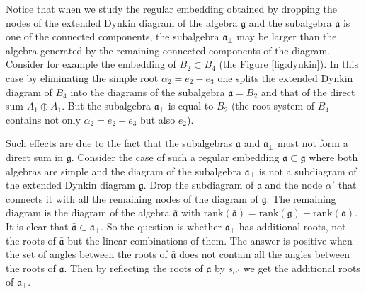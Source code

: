 \documentclass[a4paper,12pt]{article}
\theoremstyle{definition} \newtheorem{Def}{Definition}
\begin{document}
Notice that when we study the regular embedding obtained by dropping the nodes
of the extended Dynkin diagram of the algebra $\mathfrak{g}$ and the
subalgebra $\mathfrak{a}$ is one of the connected components,
the subalgebra $\mathfrak{a}_{\bot}$ may be larger than the algebra
generated by the remaining connected components of the diagram.
Consider for example the embedding of $B_2\subset B_4$ (the Figure \ref{fig:dynkin}).
In this case by eliminating
the simple root $\alpha_2=e_2-e_3$ one splits the extended Dynkin diagram of $B_4$
into the diagrams of the subalgebra $\mathfrak{a}=B_2$ and that of the direct
sum $A_1 \oplus A_1 $. But the subalgebra $\mathfrak{a}_{\bot}$ is equal to $B_2$ (the root system of $B_4$ contains not only $\alpha_2=e_2-e_3$ but also $e_2$).

Such effects are due to the fact that the subalgebras $\mathfrak{a}$ and $\mathfrak{a}_{\bot}$ must not form a direct sum in $\mathfrak{g}$.  
Consider the case of such a regular embedding $\mathfrak{a}\subset \mathfrak{g}$ where both algebras are simple and the diagram of the subalgebra $\mathfrak{a}_{\bot}$ is not a subdiagram of the extended Dynkin diagram $\mathfrak{g}$.
 Drop the subdiagram of $\mathfrak{a}$ and the node $\alpha'$ that connects it with all the remaining nodes of the diagram of $\mathfrak{g}$. The remaining diagram is the diagram of the algebra $\mathfrak{\bar{a}}$ with $\mathrm{rank}(\mathfrak{\bar{a}}) = \mathrm{rank}(\mathfrak{g})-\mathrm{rank}(\mathfrak{a})$. It is clear that $\mathfrak{\bar{a}}\subset \mathfrak{a}_{\bot}$. So the question is whether $\mathfrak{a}_{\bot}$ has additional roots,  not the roots of $\mathfrak{\bar{a}}$ but the linear combinations of them. The answer is positive  when the set of angles between the roots of $\mathfrak{\bar{a}}$ does not contain all the angles between the roots of $\mathfrak{a}$. Then by reflecting the roots of $\mathfrak{a}$ by $s_{\alpha'}$ we get the additional roots of $\mathfrak{a}_{\bot}$. 
\end{document}

